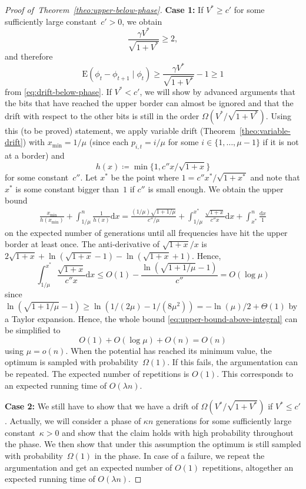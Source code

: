 \documentclass[11pt, a4paper]{article}
\newcommand{\xmin}{x_{\min}}
\newcommand*{\E}{\mathrm{E}}
\newenvironment{proofof}[1]{\begin{proof}[Proof of~#1]}{\end{proof}}
\begin{document}
\begin{proofof}{Theorem~\ref{theo:upper-below-phase}}
\textbf{Case 1:}
If $V^*\ge c'$ for some sufficiently large constant~$c'>0$, we obtain 
\[
\frac{\gamma V^*}{\sqrt{1+V^*}} \ge 2,
\]
and therefore 
\[\E(\phi_t-\phi_{t+1}\mid \phi_t)\ge \frac{\gamma V^*}{\sqrt{1+V^*}}-1 \ge  
1\]
from \eqref{eq:drift-below-phase}. If $V^*<c'$, we will show by advanced arguments that the bits 
that have reached the upper border can almost be ignored and that 
the drift with respect to the other bits is still in the order $\Omega(V^*/\sqrt{1+V^*})$.  Using this (to be proved) statement, 
we apply variable drift (Theorem~\ref{theo:variable-drift}) with $\xmin=1/\mu$ (since each $p_{i,t}=i/\mu$ for some $i\in\{1,\dots,\mu-1\}$ if 
it is not at a border) and \[h(x)\coloneqq \min\{1, c''x/\sqrt{1+x}\}\] for some constant~$c''$. Let $x^*$ be the point where 
$1=c''x^*/\sqrt{1+x^*}$ and note that $x^*$ is some constant bigger than~$1$ if $c''$ is small enough. We obtain the upper bound
\begin{align}
 \frac{\xmin}{h(\xmin)} + \int_{1/\mu}^n \frac{1}{h(x)}\mathrm{d}x = \frac{(1/\mu)\sqrt{1+1/\mu}}{c''/\mu} + \int_{1/\mu}^{x^*} \frac{\sqrt{1+x}}{c''x}\mathrm{d}x 
+ \int_{x^*}^n \frac{\mathrm{d}x }{1} 
\label{eq:upper-bound-above-integral}
\end{align}
on the expected number of generations until all frequencies have hit the upper border at least once. 
The anti-derivative of $\sqrt{1+x}/x$ is $2\sqrt{1+x}+\ln(\sqrt{1+x}-1) - \ln(\sqrt{1+x}+1)$. 
Hence, \[
\int_{1/\mu}^{x^*} \frac{\sqrt{1+x}}{c''x}\mathrm{d}x \le O(1) - \frac{\ln(\sqrt{1+1/\mu}-1)}{c''} = O(\log \mu)
\]
since $\ln(\sqrt{1+1/\mu}-1)\ge \ln(1/(2\mu)-1/(8\mu^2)) = -\ln(\mu)/2+\Theta(1)$ by 
a Taylor expansion. Hence, the whole bound \eqref{eq:upper-bound-above-integral} can be simplified 
to \[
O(1) + O(\log\mu) + O(n) = O(n)
\]
using $\mu=o(n)$. When the potential has reached its minimum value, the optimum is sampled 
with probability~$\Omega(1)$. If this fails, the argumentation can be repeated. The expected number 
of repetitions is $O(1)$.  
This corresponds to an expected running time of $O(\lambda n)$.

\textbf{Case 2: }
We still have to show that we have a drift of $\Omega(V^*/\sqrt{1+V^*})$ if $V^*\le c'$. Actually, 
we will consider a phase of $\kappa n$ generations for some sufficiently large constant~$\kappa>0$ 
and show that the claim holds with high probability throughout the phase.
We then show that under this assumption the optimum is still sampled with probability~$\Omega(1)$ in the phase. 
In case of a failure, we repeat the argumentation and get an expected number of $O(1)$ repetitions, altogether 
an expected running time of $O(\lambda n)$.


\end{proofof}
\end{document}
